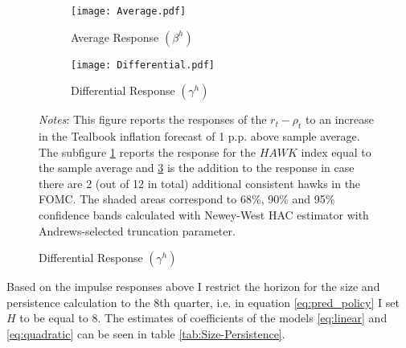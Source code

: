 \documentclass[12pt]{article}
\numberwithin{equation}{section}
\begin{document}
\begin{figure}[!htbp]\centering
    \caption{Policy Response to Inflation and FOMC Hawkishness}\vspace{2ex}
    \label{fig:LP}
    \begin{subfigure}[b]{0.49\textwidth}
        \centering
        \caption{Average Response $(\beta^h)$}
        \label{fig:AverageResponce}
        \texttt{[image: Average.pdf]}
    \end{subfigure}
    \hfill
    \begin{subfigure}[b]{0.49\textwidth}
        \centering
        \caption{Differential Response $(\gamma^h)$}
        \label{fig:DifferentialResponce}
        \texttt{[image: Differential.pdf]}
    \end{subfigure}
        {\begin{flushleft}\scriptsize\textit{Notes}: This figure reports the responses of the $r_t-\rho_t$ to an increase in the Tealbook inflation forecast of 1 p.p. above sample average. The subfigure \ref{fig:AverageResponce} reports the response for the $\mathit{HAWK}$ index equal to the sample average and \ref{fig:DifferentialResponce} is the addition to the response in case there are 2 (out of 12 in total) additional consistent hawks in the FOMC. The shaded areas correspond to 68\%, 90\% and 95\% confidence bands calculated with Newey-West HAC estimator with Andrews-selected truncation parameter.\end{flushleft}}
\end{figure}

Based on the impulse responses above I restrict the horizon for the size and persistence calculation to the 8th quarter, i.e. in equation \vref{eq:pred_policy} I set $H$ to be equal to 8. The estimates of coefficients of the models \eqref{eq:linear} and \eqref{eq:quadratic} can be seen in table \vref{tab:Size-Persistence}.
\end{document}
